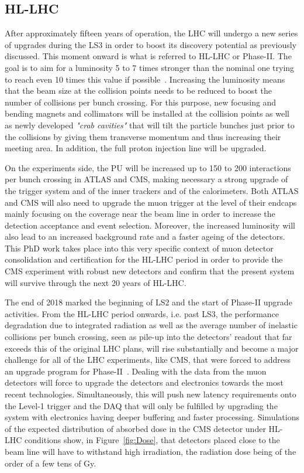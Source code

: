 	\subsection{\acl{HL-LHC}}
	\label{chapt2:ssec:HL-LHC}
		
	After approximately fifteen years of operation, the LHC will undergo a new series of upgrades during the LS3 in order to boost its discovery potential as previously discussed. This moment onward is what is referred to HL-LHC or Phase-II. The goal is to aim for a luminosity 5 to 7 times stronger than the nominal one trying to reach even 10 times this value if possible~\cite{HLLHC2017,HLLHCPDR}. Increasing the luminosity means that the beam size at the collision points needs to be reduced to boost the number of collisions per bunch crossing. For this purpose, new focusing and bending magnets and collimators will be installed at the collision points as well as newly developed \textit{"crab cavities"} that will tilt the particle bunches just prior to the collisions by giving them transverse momentum and thus increasing their meeting area. In addition, the full proton injection line will be upgraded.
	
	On the experiments side, the \acf{PU} will be increased up to 150 to 200 interactions per bunch crossing in ATLAS and CMS, making necessary a strong upgrade of the trigger system and of the inner trackers and of the calorimeters. Both ATLAS and CMS will also need to upgrade the muon trigger at the level of their endcaps mainly focusing on the coverage near the beam line in order to increase the detection acceptance and event selection. Moreover, the increased luminosity will also lead to an increased background rate and a faster ageing of the detectors. This PhD work takes place into this very specific context of muon detector consolidation and certification for the HL-LHC period in order to provide the CMS experiment with robust new detectors and confirm that the present system will survive through the next 20 years of HL-LHC.

	The end of 2018 marked the beginning of LS2 and the start of Phase-II upgrade activities. From the HL-LHC period onwards, i.e. past LS3, the performance degradation due to integrated radiation as well as the average number of inelastic collisions per bunch crossing, seen as pile-up into the detectors' readout that far exceeds this of the original LHC plans, will rise substantially and become a major challenge for all of the LHC experiments, like CMS, that were forced to address an upgrade program for Phase-II~\cite{PHASEIITP}. Dealing with the data from the muon detectors will force to upgrade the detectors and electronics towards the most recent technologies. Simultaneously, this will push new latency requirements onto the Level-1 trigger and the \acf{DAQ} that will only be fulfilled by upgrading the system with electronics having deeper buffering and faster processing. Simulations of the expected distribution of absorbed dose in the CMS detector under HL-LHC conditions show, in Figure~\ref{fig:Dose}, that detectors placed close to the beam line will have to withstand high irradiation, the radiation dose being of the order of a few tens of \si{Gy}.


